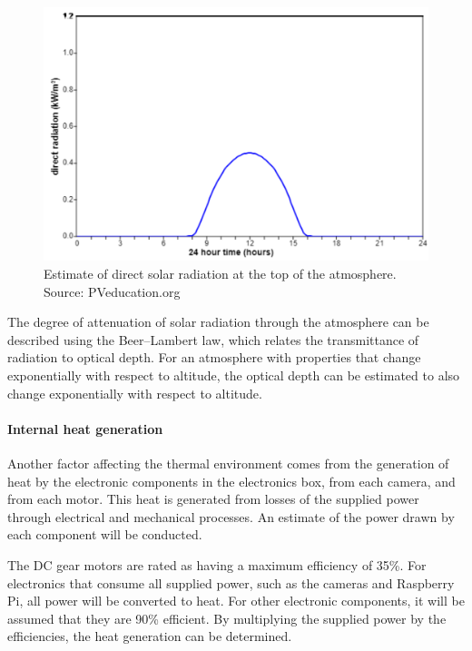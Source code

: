 	\begin{figure}[h!]
    \centering
    \includegraphics[scale=0.6]{4-experiment-design/img/mechanical/directradiation.png}
	\caption{Estimate of direct solar radiation at the top of the atmosphere. Source: PVeducation.org}
	\label{fig:directradiation}
	\end{figure}

The degree of attenuation of solar radiation through the atmosphere can be described using the Beer–Lambert law, which relates the transmittance of radiation to optical depth. For an atmosphere with properties that change exponentially with respect to altitude, the optical depth can be estimated to also change exponentially with respect to altitude. \\

\paragraph{Internal heat generation}
Another factor affecting the thermal environment comes from the generation of heat by the electronic components in the electronics box, from each camera, and from each motor. This heat is generated from losses of the supplied power through electrical and mechanical processes. An estimate of the power drawn by each component will be conducted.



The DC gear motors are rated as having a maximum efficiency of 35\%. 
For electronics that consume all supplied power, such as the cameras and Raspberry Pi, all power will be converted to heat.
For other electronic components, it will be assumed that they are 90\% efficient. By multiplying the supplied power by the efficiencies, the heat generation can be determined.

